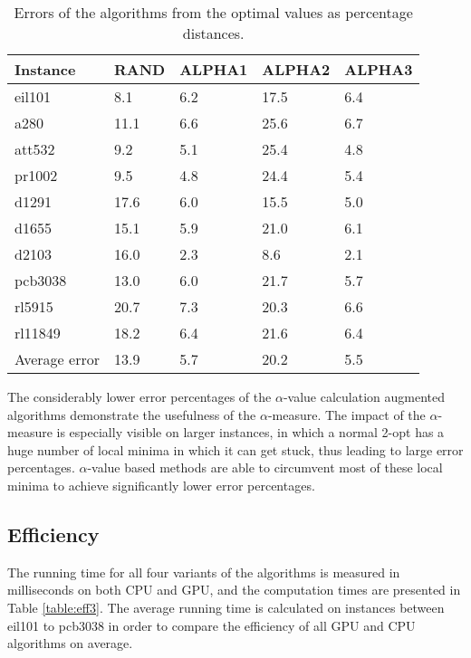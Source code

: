 \documentclass[english, 12pt, a4paper, sci, utf8, a-1b, online]{aaltothesis}
\begin{document}
\begin{table}[H]
\centering
\begin{tabular}{@{}lllll@{}}
\toprule
Instance & RAND  & ALPHA1 & ALPHA2 & ALPHA3 \\ \midrule
eil101   & 8.1   & 6.2    & 17.5   & 6.4    \\
a280     & 11.1  & 6.6    & 25.6   & 6.7    \\
att532   & 9.2 & 5.1  & 25.4  & 4.8  \\
pr1002   & 9.5   & 4.8    & 24.4   & 5.4    \\
d1291    & 17.6  & 6.0    & 15.5   & 5.0    \\
d1655    & 15.1  & 5.9    & 21.0   & 6.1    \\
d2103    & 16.0  & 2.3    & 8.6    & 2.1    \\
pcb3038  & 13.0  & 6.0    & 21.7   & 5.7    \\
rl5915   & 20.7  & 7.3    & 20.3   & 6.6    \\
rl11849  & 18.2  & 6.4    & 21.6   & 6.4    \\ \midrule
Average error & 13.9 & 5.7    & 20.2   & 5.5 \\\bottomrule
\end{tabular}
\caption{Errors of the algorithms from the optimal values as percentage distances.} \label{table:reserr}
\end{table}

The considerably lower error percentages of the $\alpha$-value calculation augmented algorithms demonstrate the usefulness of the $\alpha$-measure. The impact of the $\alpha$-measure is especially visible on larger instances, in which a normal 2-opt has a huge number of local minima in which it can get stuck, thus leading to large error percentages. $\alpha$-value based methods are able to circumvent most of these local minima to achieve significantly lower error percentages.

\subsection{Efficiency}
The running time for all four variants of the algorithms is measured in milliseconds on both CPU and GPU, and the computation times are presented in Table \ref{table:eff3}. The average running time is calculated on instances between eil101 to pcb3038 in order to compare the efficiency of all GPU and CPU algorithms on average.
\end{document}
